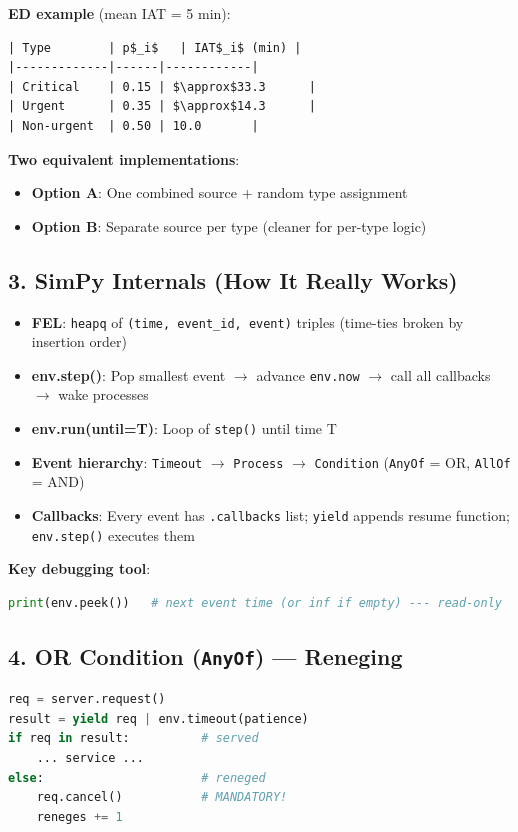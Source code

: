 \documentclass[11pt]{article}
\begin{document}
\textbf{ED example} (mean IAT = 5 min):
\begin{verbatim}
| Type        | p$_i$   | IAT$_i$ (min) |
|-------------|------|------------|
| Critical    | 0.15 | $\approx$33.3      |
| Urgent      | 0.35 | $\approx$14.3      |
| Non-urgent  | 0.50 | 10.0       |
\end{verbatim}

\textbf{Two equivalent implementations}:
\begin{itemize}[leftmargin=*]
\item \textbf{Option A}: One combined source + random type assignment
\item \textbf{Option B}: Separate source per type (cleaner for per-type logic)
\end{itemize}

\subsection*{3. SimPy Internals (How It Really Works)}
\begin{itemize}[leftmargin=*]
\item \textbf{FEL}: \texttt{heapq} of \texttt{(time, event\_id, event)} triples (time-ties broken by insertion order)
\item \textbf{env.step()}: Pop smallest event $\rightarrow$ advance \texttt{env.now} $\rightarrow$ call all callbacks $\rightarrow$ wake processes
\item \textbf{env.run(until=T)}: Loop of \texttt{step()} until time T
\item \textbf{Event hierarchy}: \texttt{Timeout} $\rightarrow$ \texttt{Process} $\rightarrow$ \texttt{Condition} (\texttt{AnyOf} = OR, \texttt{AllOf} = AND)
\item \textbf{Callbacks}: Every event has \texttt{.callbacks} list; \texttt{yield} appends resume function; \texttt{env.step()} executes them
\end{itemize}

\textbf{Key debugging tool}:
\begin{lstlisting}[language=Python]
print(env.peek())   # next event time (or inf if empty) --- read-only
\end{lstlisting}

\subsection*{4. OR Condition (\texttt{AnyOf}) --- Reneging}
\begin{lstlisting}[language=Python]
req = server.request()
result = yield req | env.timeout(patience)
if req in result:          # served
    ... service ...
else:                      # reneged
    req.cancel()           # MANDATORY!
    reneges += 1
\end{lstlisting}
\end{document}

